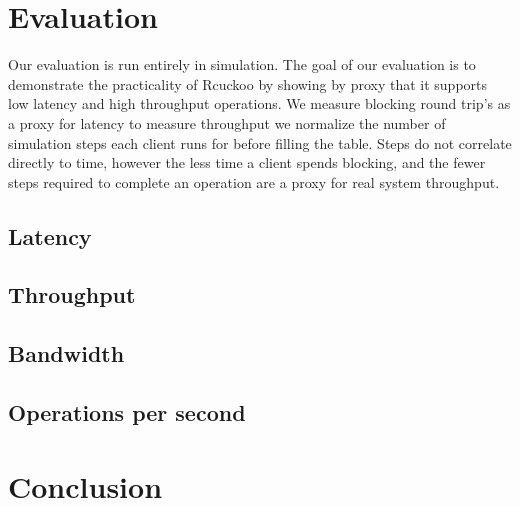 \section{Evaluation}
\label{sec:eval}

Our evaluation is run entirely in simulation. The goal of
our evaluation is to demonstrate the practicality of Rcuckoo
by showing by proxy that it supports low latency and high
throughput operations. We measure blocking round trip's as a
proxy for latency to measure throughput we normalize the
number of simulation steps each client runs for before
filling the table. Steps do not correlate directly to time,
however the less time a client spends blocking, and the
fewer steps required to complete an operation are a proxy
for real system throughput.

\subsection{Latency}

\subsection{Throughput}

\subsection{Bandwidth}

\subsection{Operations per second}



\section{Conclusion}
\label{sec:conclusion}
